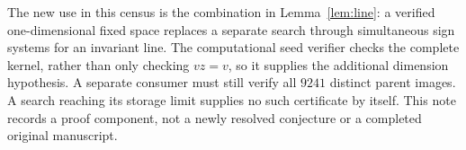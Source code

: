 \documentclass[11pt]{article}
\begin{document}
The new use in this census is the combination in
Lemma~\ref{lem:line}: a verified one-dimensional fixed space replaces a
separate search through simultaneous sign systems for an invariant line.
The computational seed verifier checks the complete kernel, rather than
only checking $vz=v$, so it supplies the additional dimension hypothesis.
A separate consumer must still verify all $9241$ distinct parent images.
A search reaching its storage limit supplies no such certificate by
itself. This note records a proof component, not a newly resolved
conjecture or a completed original manuscript.
\end{document}
